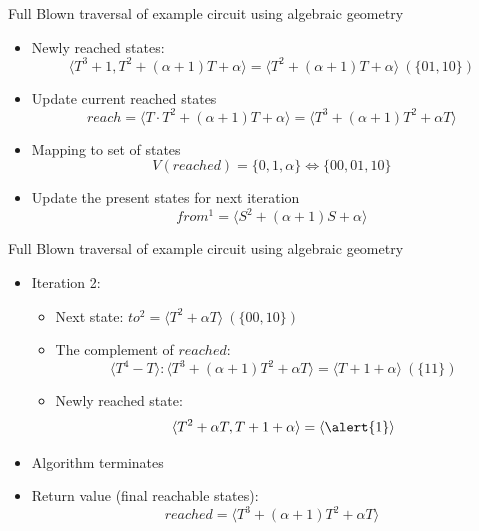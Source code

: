 \documentclass[xcolor=dvipsnames]{beamer}
\newcommand{\bi}{\begin{itemize}}
\newcommand{\ei}{\end{itemize}}
\begin{document}
\begin{frame}[label = pptpage3]{\large{Full Blown traversal of example circuit using algebraic geometry}}
\bi
\item Newly reached states:
$$\langle T^3+1, T^2+(\alpha+1)T+\alpha \rangle = \langle T^2+(\alpha+1)T+\alpha \rangle~(\{01,10\})$$ 
\item Update current reached states 
$$reach = \langle T\cdot T^2+(\alpha+1)T+\alpha \rangle = \langle T^3+(\alpha+1)T^2+\alpha T\rangle$$ 
\item Mapping to set of states
$$V(reached) = \{0,1,\alpha\} \Leftrightarrow \{00,01,10\}$$
\item Update the present states for next iteration
$$from^1 = \langle S^2+(\alpha+1)S+\alpha\rangle$$
\ei
\hyperlink{linkSTG}{}
\end{frame}


\begin{frame}{\large{Full Blown traversal of example circuit using algebraic geometry}}
\bi
\item Iteration 2:
	\bi
	\item Next state: $to^2 = \langle T^2+\alpha T\rangle~(\{00,10\})$
	\item The complement of $reached$:
	$$\langle T^4-T\rangle:\langle T^3+(\alpha+1)T^2+\alpha T\rangle
= \langle T + 1+\alpha\rangle ~(\{11\})$$ 
	\item Newly reached state: 
$$\langle T^2+\alpha T, T+1+\alpha \rangle = \langle \alert{1}\rangle$$ 
	\ei
\item Algorithm terminates
\item Return value (final reachable states):
$$reached = \langle T^3+(\alpha+1)T^2+\alpha T\rangle$$
\ei
\end{frame}
\end{document}
